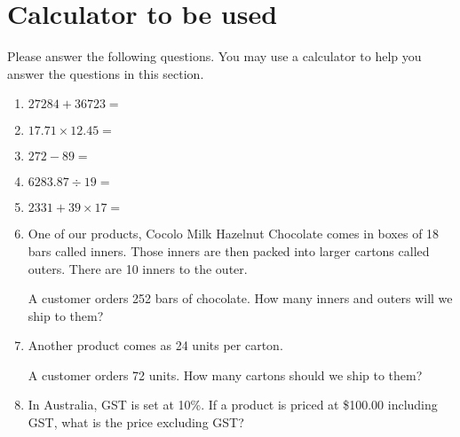 \documentclass[a4paper]{article}
\begin{document}
\section{Calculator to be used}
Please answer the following questions. You may use a calculator to help you answer the questions in this section.
\begin{enumerate}\addtolength{\itemsep}{3\baselineskip}

\item \begin{math} 27284 + 36723 = \end{math} 
\item \begin{math} 17.71 \times 12.45 = \end{math} 
\item \begin{math} 272 - 89 = \end{math} 
\item \begin{math} 6283.87 \div 19 = \end{math} 
\item \begin{math} 2331 + 39 \times 17 = \end{math} 
\item One of our products, Cocolo Milk Hazelnut Chocolate comes in boxes of 18 bars called inners. Those inners are then packed into larger cartons called outers. There are 10 inners to the outer. 

A customer orders 252 bars of chocolate. How many inners and outers will we ship to them?


\item Another product comes as 24 units per carton. 

A customer orders 72 units. How many cartons should we ship to them?



\item In Australia, GST is set at 10\%. If a product is priced at
  \$100.00 including GST, what is the price excluding GST?



\end{enumerate}
\end{document}
